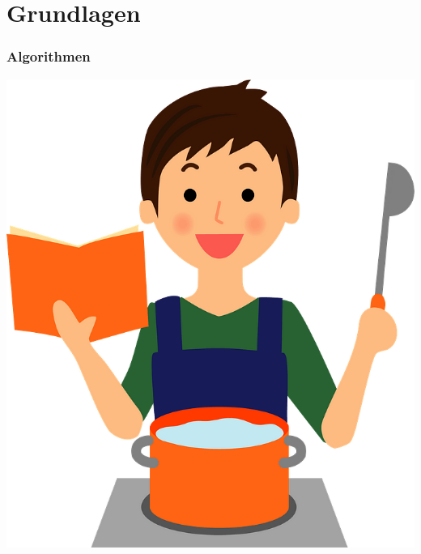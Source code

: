 \documentclass[aspectratio=169,xcolor=dvipsnames]{beamer}
\begin{document}
\begin{frame}
\frametitle{}
\end{frame}

\begin{frame}
\frametitle{}
\end{frame}

\section{Grundlagen}

\begin{frame}
\frametitle{\glqq Algorithmen\grqq}
\begin{center}
\includegraphics[height=0.75\paperheight,keepaspectratio]{images/man-cooking-clipart} 
\end{center}
\end{frame}
\end{document}
